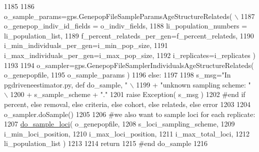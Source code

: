 \begin{DoxyCode}
1185 
1186             o\_sample\_params=gps.GenepopFileSampleParamsAgeStructureRelateds( \(\backslash\)
1187                                         o\_genepop\_indiv\_id\_fields = o\_indiv\_fields,
1188                                         li\_population\_numbers = li\_population\_list,
1189                                         f\_percent\_relateds\_per\_gen=f\_percent\_relateds,
1190                                         i\_min\_individuals\_per\_gen=i\_min\_pop\_size,
1191                                         i\_max\_individuals\_per\_gen=i\_max\_pop\_size,
1192                                         i\_replicates=i\_replicates )
1193 
1194             o\_sampler=gps.GenepopFileSamplerIndividualsAgeStructureRelateds( o\_genepopfile,
1195                                                                     o\_sample\_params )
1196     \textcolor{keywordflow}{else}:
1197 
1198         s\_msg=\textcolor{stringliteral}{"In pgdriveneestimator.py, def do\_sample, "} \(\backslash\)
1199                 + \textcolor{stringliteral}{"unknown sampling scheme: "} \(\backslash\)
1200                 + s\_sample\_scheme + \textcolor{stringliteral}{"."}
1201         \textcolor{keywordflow}{raise} Exception( s\_msg )
1202     \textcolor{comment}{#end if percent, else removal, else criteria, else cohort, else relateds, else error}
1203 
1204     o\_sampler.doSample()
1205 
1206     \textcolor{comment}{#we also want to sample loci for each replicate:}
1207     \hyperlink{namespacenegui_1_1pgdriveneestimator_a0f8c557a38f7d89e3e494696c863311f}{do\_sample\_loci}( o\_genepopfile,
1208                     s\_loci\_sampling\_scheme,
1209                     i\_min\_loci\_position,
1210                     i\_max\_loci\_position,
1211                     i\_max\_total\_loci,
1212                     li\_population\_list )
1213 
1214     \textcolor{keywordflow}{return}
1215 \textcolor{comment}{#end do\_sample}
1216 
\end{DoxyCode}
